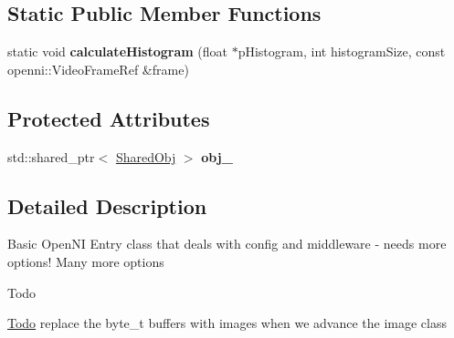 \subsection*{\-Static \-Public \-Member \-Functions}
\begin{DoxyCompactItemize}
\item 
\hypertarget{classs9_1_1oni_1_1OpenNIBase_a0b76d331951505046de6a696219ecb3e}{static void {\bfseries calculate\-Histogram} (float $\ast$p\-Histogram, int histogram\-Size, const openni\-::\-Video\-Frame\-Ref \&frame)}\label{classs9_1_1oni_1_1OpenNIBase_a0b76d331951505046de6a696219ecb3e}

\end{DoxyCompactItemize}
\subsection*{\-Protected \-Attributes}
\begin{DoxyCompactItemize}
\item 
\hypertarget{classs9_1_1oni_1_1OpenNIBase_aa4fd20c82372228f9dd7505077b352e4}{std\-::shared\-\_\-ptr$<$ \hyperlink{classs9_1_1oni_1_1OpenNIBase_1_1SharedObj}{\-Shared\-Obj} $>$ {\bfseries obj\-\_\-}}\label{classs9_1_1oni_1_1OpenNIBase_aa4fd20c82372228f9dd7505077b352e4}

\end{DoxyCompactItemize}


\subsection{\-Detailed \-Description}
\-Basic \-Open\-N\-I \-Entry class that deals with config and middleware  -\/ needs more options! \-Many more options \begin{DoxyRefDesc}{\-Todo}
\item[\hyperlink{todo__todo000020}{\-Todo}]replace the byte\-\_\-t buffers with images when we advance the image class \end{DoxyRefDesc}



